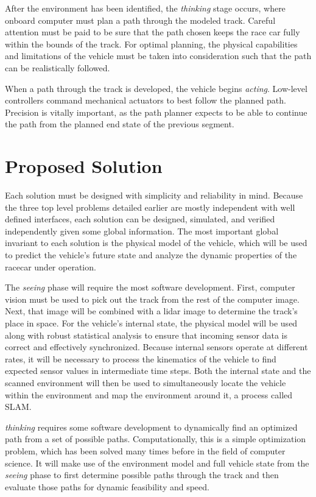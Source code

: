\documentclass[10pt,draftclsnofoot,onecolumn]{article}
\begin{document}
After the environment has been identified, the \textit{thinking} stage occurs, where onboard computer must plan a path through the modeled track. Careful attention must be paid to be sure that the path chosen keeps the race car fully within the bounds of the track. For optimal planning, the physical capabilities and limitations of the vehicle must be taken into consideration such that the path can be realistically followed. 

When a path through the track is developed, the vehicle begins \textit{acting}. Low-level controllers command mechanical actuators to best follow the planned path. Precision is vitally important, as the path planner expects to be able to continue the path from the planned end state of the previous segment. 

\section{Proposed Solution}
Each solution must be designed with simplicity and reliability in mind. Because the three top level problems detailed earlier are mostly independent with well defined interfaces, each solution can be designed, simulated, and verified independently given some global information. The most important global invariant to each solution is the physical model of the vehicle, which will be used to predict the vehicle's future state and analyze the dynamic properties of the racecar under operation.

The \textit{seeing} phase will require the most software development. First, computer vision must be used to pick out the track from the rest of the computer image. Next, that image will be combined with a lidar image to determine the track's place in space. For the vehicle's internal state, the physical model will be used along with robust statistical analysis to ensure that incoming sensor data is correct and effectively synchronized. Because internal sensors operate at different rates, it will be necessary to process the kinematics of the vehicle to find expected sensor values in intermediate time steps. Both the internal state and the scanned environment will then be used to simultaneously locate the vehicle within the environment and map the environment around it, a process called SLAM.

\textit{thinking} requires some software development to dynamically find an optimized path from a set of possible paths. Computationally, this is a simple optimization problem, which has been solved many times before in the field of computer science. It will make use of the environment model and full vehicle state from the \textit{seeing} phase to first determine possible paths through the track and then evaluate those paths for dynamic feasibility and speed.
\end{document}
